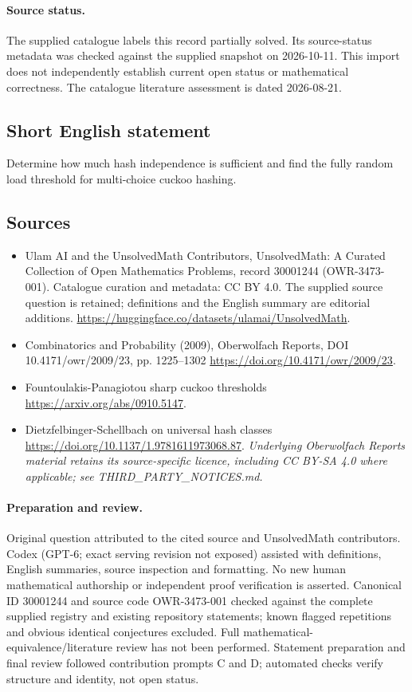 \documentclass[11pt]{article}
\begin{document}
\paragraph{Source status.}
The supplied catalogue labels this record partially solved. Its source-status metadata was checked against the supplied snapshot on 2026-10-11. This import does not independently establish current open status or mathematical correctness. The catalogue literature assessment is dated 2026-08-21.
\subsection{Short English statement}
Determine how much hash independence is sufficient and find the fully random load threshold for multi-choice cuckoo hashing.
\subsection{Sources}
\begin{itemize}
\item[S1] Ulam AI and the UnsolvedMath Contributors, UnsolvedMath: A Curated Collection of Open Mathematics Problems, record 30001244 (OWR-3473-001). Catalogue curation and metadata: CC BY 4.0. The supplied source question is retained; definitions and the English summary are editorial additions.
\url{https://huggingface.co/datasets/ulamai/UnsolvedMath}.
\item[S2] Combinatorics and Probability (2009), Oberwolfach Reports, DOI 10.4171/owr/2009/23, pp. 1225--1302
\url{https://doi.org/10.4171/owr/2009/23}.
\item[S3] Fountoulakis-Panagiotou sharp cuckoo thresholds
\url{https://arxiv.org/abs/0910.5147}.
\item[S4] Dietzfelbinger-Schellbach on universal hash classes
\url{https://doi.org/10.1137/1.9781611973068.87}.
\textit{Underlying Oberwolfach Reports material retains its source-specific licence, including CC BY-SA 4.0 where applicable; see THIRD\_PARTY\_NOTICES.md.}
\end{itemize}
\paragraph{Preparation and review.}
Original question attributed to the cited source and UnsolvedMath contributors. Codex (GPT-6; exact serving revision not exposed) assisted with definitions, English summaries, source inspection and formatting. No new human mathematical authorship or independent proof verification is asserted. Canonical ID 30001244 and source code OWR-3473-001 checked against the complete supplied registry and existing repository statements; known flagged repetitions and obvious identical conjectures excluded. Full mathematical-equivalence/literature review has not been performed. Statement preparation and final review followed contribution prompts C and D; automated checks verify structure and identity, not open status.
\label{end:30001244}
\end{document}
